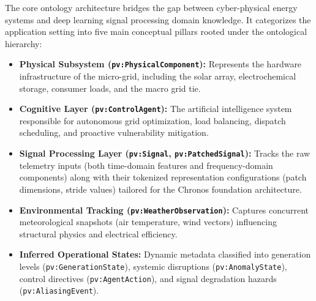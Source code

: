 The core ontology architecture bridges the gap between cyber-physical energy systems and deep learning signal processing domain knowledge. It categorizes the application setting into five main conceptual pillars rooted under the ontological hierarchy:

\begin{itemize}
    \item \textbf{Physical Subsystem (\texttt{pv:PhysicalComponent}):} Represents the hardware infrastructure of the micro-grid, including the solar array, electrochemical storage, consumer loads, and the macro grid tie.
    \item \textbf{Cognitive Layer (\texttt{pv:ControlAgent}):} The artificial intelligence system responsible for autonomous grid optimization, load balancing, dispatch scheduling, and proactive vulnerability mitigation.
    \item \textbf{Signal Processing Layer (\texttt{pv:Signal}, \texttt{pv:PatchedSignal}):} Tracks the raw telemetry inputs (both time-domain features and frequency-domain components) along with their tokenized representation configurations (patch dimensions, stride values) tailored for the Chronos foundation architecture.
    \item \textbf{Environmental Tracking (\texttt{pv:WeatherObservation}):} Captures concurrent meteorological snapshots (air temperature, wind vectors) influencing structural physics and electrical efficiency.
    \item \textbf{Inferred Operational States:} Dynamic metadata classified into generation levels (\texttt{pv:GenerationState}), systemic disruptions (\texttt{pv:AnomalyState}), control directives (\texttt{pv:AgentAction}), and signal degradation hazards (\texttt{pv:AliasingEvent}).
\end{itemize}

